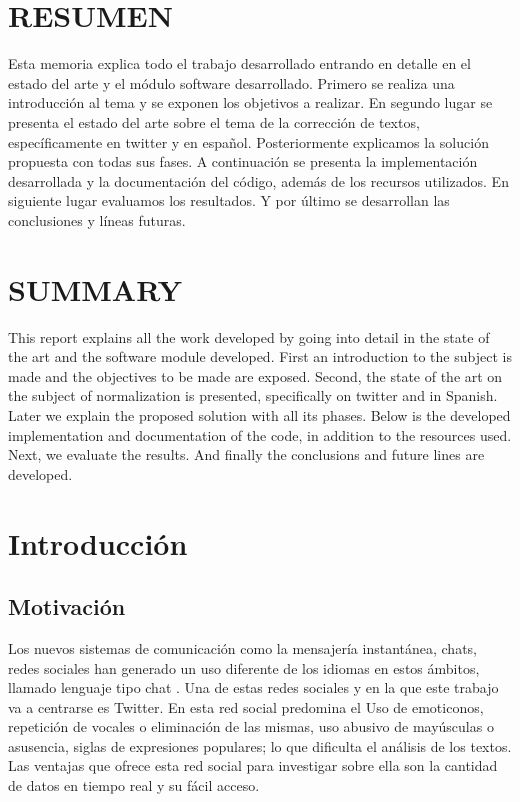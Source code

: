 \documentclass[spanish,12pt, a4paper,twoside]{paper}
\let\oldsection\section
\def\section{\cleardoublepage\oldsection}
\newcommand\blankpage{%
    \null
    \thispagestyle{empty}%
    \addtocounter{page}{-1}%
    \newpage}
\begin{document}
\afterpage{\blankpage}

\section*{RESUMEN}
Esta memoria explica todo el trabajo desarrollado entrando en detalle en el estado del arte y el  módulo software desarrollado. Primero se realiza una introducción al tema y se exponen los objetivos a realizar. En segundo lugar se presenta el estado del arte sobre el tema de la corrección de textos, específicamente en twitter y en español. Posteriormente explicamos la solución propuesta con todas sus fases. A continuación se presenta la implementación desarrollada y la documentación del código, además de los recursos utilizados. En siguiente lugar evaluamos los resultados. Y por último se desarrollan las conclusiones y líneas futuras.


\section*{SUMMARY}
This report explains all the work developed by going into detail in the state of the art and the software module developed. First an introduction to the subject is made and the objectives to be made are exposed. Second, the state of the art on the subject of normalization is presented, specifically on twitter and in Spanish. Later we explain the proposed solution with all its phases. Below is the developed implementation and documentation of the code, in addition to the resources used. Next, we evaluate the results. And finally the conclusions and future lines are developed.


\tableofcontents %



\listoffigures
\listoftables



\newpage
{} 

\section{Introducción}\label{sec:introduccion}
\subsection{Motivación}\label{sec:motivacion}
Los nuevos sistemas de comunicación como la mensajería instantánea, chats, redes sociales han generado un uso diferente de los idiomas en estos ámbitos, llamado lenguaje tipo chat \cite{forsyth:2007}. Una de estas redes sociales y en la que este trabajo va a centrarse es Twitter. En esta red social predomina el Uso de emoticonos, repetición de vocales o eliminación de las mismas, uso abusivo de mayúsculas o asusencia, siglas de expresiones populares; lo que dificulta el análisis de los textos. Las ventajas que ofrece esta red social para investigar sobre ella son la cantidad de datos en tiempo real y su fácil acceso.\\
\end{document}
